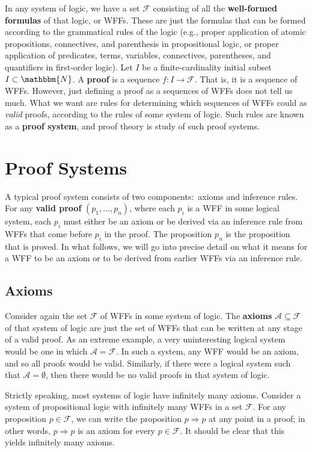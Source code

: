 \documentclass[11pt]{article}
\theoremstyle{definition}
\theoremstyle{remark}
\begin{document}
In any system of logic, we have a set $\mathcal{F}$ consisting of all the \textbf{well-formed formulas} of that logic, or WFFs. These are just the formulas that can be formed according to the grammatical rules of the logic (e.g., proper application of atomic propositions, connectives, and parenthesis in propositional logic, or proper application of predicates, terms, variables, connectives, parentheses, and quantifiers in first-order logic). Let $I$ be a finite-cardinality initial subset $I\subset \mathbbm{N}$. A \textbf{proof} is a sequence $f:I\rightarrow \mathcal{F}$. That is, it is a sequence of WFFs. However, just defining a proof as a sequences of WFFs does not tell us much. What we want are rules for determining which sequences of WFFs could as \textit{valid} proofs, according to the rules of some system of logic. Such rules are known as a \textbf{proof system}, and proof theory is study of such proof systems.\par


\section{Proof Systems}
A typical proof system consists of two components:\ axioms and inference rules. For any \textbf{valid proof} $(p_{1},\dots,p_{n})$, where each $p_{i}$ is a WFF in some logical system, each $p_{i}$ must either be an axiom or be derived via an inference rule from WFFs that come before $p_{i}$ in the proof. The proposition $p_{n}$ is the proposition that is proved. In what follows, we will go into precise detail on what it means for a WFF to be an axiom or to be derived from earlier WFFs via an inference rule.

\subsection{Axioms}
Consider again the set $\mathcal{F}$ of WFFs in some system of logic. The \textbf{axioms} $\mathcal{A}\subseteq\mathcal{F}$ of that system of logic are just the set of WFFs that can be written at any stage of a valid proof. As an extreme example, a very uninteresting logical system would be one in which $\mathcal{A}=\mathcal{F}$. In such a system, any WFF would be an axiom, and so all proofs would be valid. Similarly, if there were a logical system such that $\mathcal{A}=\emptyset$, then there would be no valid proofs in that system of logic.\par

Strictly speaking, most systems of logic have infinitely many axioms. Consider a system of propositional logic with infinitely many WFFs in a set $\mathcal{F}$. For any proposition $p\in\mathcal{F}$, we can write the proposition $p\Rightarrow p$ at any point in a proof; in other words, $p\Rightarrow p$ is an axiom for every $p\in\mathcal{F}$. It should be clear that this yields infinitely many axioms.\par
\end{document}
